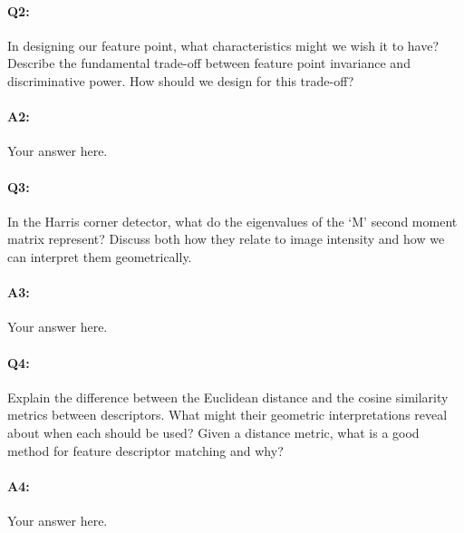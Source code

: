 
\pagebreak
\paragraph{Q2:} In designing our feature point, what characteristics might we wish it to have? Describe the fundamental trade-off between feature point invariance and discriminative power. How should we design for this trade-off?

\paragraph{A2:} Your answer here.




\pagebreak
\paragraph{Q3:} In the Harris corner detector, what do the eigenvalues of the `M' second moment matrix represent? Discuss both how they relate to image intensity and how we can interpret them geometrically.

\paragraph{A3:} Your answer here.





\pagebreak
\paragraph{Q4:} Explain the difference between the Euclidean distance and the cosine similarity metrics between descriptors. What might their geometric interpretations reveal about when each should be used? Given a distance metric, what is a good method for feature descriptor matching and why?

\paragraph{A4:} Your answer here.









